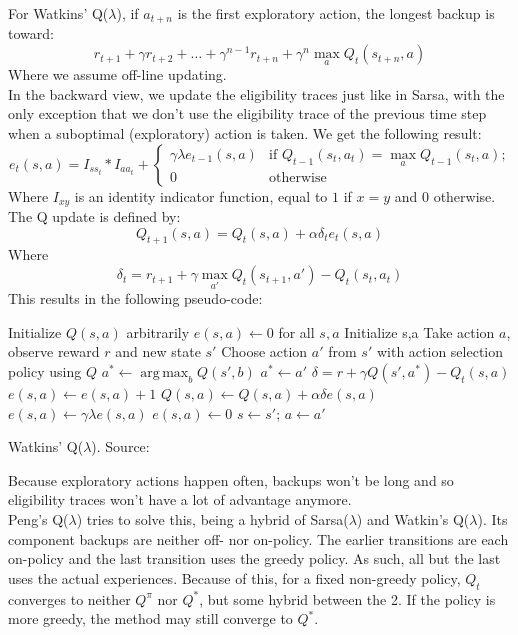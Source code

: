 \documentclass[a4paper]{article}
\DeclareMathOperator*{\argmax}{arg\,max}
\begin{document}
For Watkins' Q($\lambda$), if $a_{t+n}$ is the first exploratory action, the longest backup is toward:
\begin{equation}
r_{t+1} + \gamma r_{t+2} + \dots + \gamma^{n-1} r_{t+n} + \gamma^n \max_a Q_t(s_{t+n},a)
\end{equation}
Where we assume off-line updating.\\
In the backward view, we update the eligibility traces just like in Sarsa, with the only exception that we don't use the eligibility trace of the previous time step when a suboptimal (exploratory) action is taken. We get the following result:
\begin{equation}
e_t(s,a) = I_{s s_t} * I_{a a_t} + \begin{cases}
	\gamma \lambda e_{t-1}(s,a) & \text{if $Q_{t-1}(s_t,a_t) = \max_a Q_{t-1}(s_t,a)$;} \\
    0 & \text{otherwise}
\end{cases}
\end{equation}
Where $I_{xy}$ is an identity indicator function, equal to $1$ if $x=y$ and $0$ otherwise. The Q update is defined by:
\begin{equation}
Q_{t+1}(s,a) = Q_t(s,a) + \alpha \delta_t e_t(s,a)
\end{equation}
Where
\begin{equation}
\delta_t = r_{t+1} + \gamma \max_{a'} Q_t(s_{t+1}, a') - Q_t(s_t,a_t)
\end{equation}
This results in the following pseudo-code:\\
\begin{algorithm}[H]
\DontPrintSemicolon
Initialize $Q(s,a)$ arbitrarily\;
$e(s,a) \gets 0$ for all $s,a$\;
 {
	Initialize s,a\;
	 {
    	Take action $a$, observe reward $r$ and new state $s'$\;
        Choose action $a'$ from $s'$ with action selection policy using $Q$\;
        $a^* \gets \argmax_b Q(s',b)$\;
         {
        	$a^* \gets a'$\;
        }
        $\delta = r + \gamma Q(s',a^*) - Q_t(s,a)$\;
        $e(s,a) \gets e(s,a) + 1$\;
         {
        	$Q(s,a) \gets Q(s,a) + \alpha \delta e(s,a)$\;
             {
            	$e(s,a) \gets \gamma \lambda e(s,a)$\;
            }{
            	$e(s,a) \gets 0$\;
            }
        }
        $s \gets s'$; $a \gets a'$\;
    }
}
\caption{Watkins' Q($\lambda$). Source: \cite{Sutton1998ReinforcementIntroduction}}
\end{algorithm}
Because exploratory actions happen often, backups won't be long and so eligibility traces won't have a lot of advantage anymore.\\
Peng's Q($\lambda$) tries to solve this, being a hybrid of Sarsa($\lambda$) and Watkin's Q($\lambda$). Its component backups are neither off- nor on-policy. The earlier transitions are each on-policy and the last transition uses the greedy policy. As such, all but the last uses the actual experiences. Because of this, for a fixed non-greedy policy, $Q_t$ converges to neither $Q^{\pi}$ nor $Q^{*}$, but some hybrid between the 2. If the policy is more greedy, the method may still converge to $Q^{*}$.\\
\end{document}
